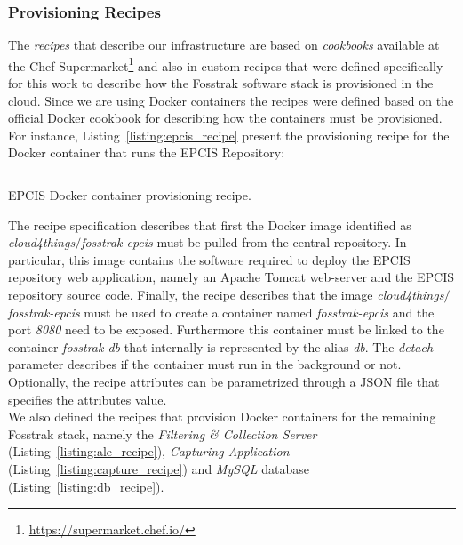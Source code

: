 \subsubsection{Provisioning Recipes}
\label{subs:recipes}
The \textit{recipes} that describe our infrastructure are based on \textit{cookbooks} available at the
Chef Supermarket\footnote{\url{https://supermarket.chef.io/}} and also in custom recipes that
were defined specifically for this work to describe how the Fosstrak software stack is provisioned
in the cloud. Since we are using Docker containers the recipes were defined based on the official
Docker cookbook for describing how the containers must be provisioned. For instance, Listing~\ref{listing:epcis_recipe}
present the provisioning recipe for the Docker container that runs the \gls{EPCIS} Repository:

\begin{listing}[ht!]
\inputminted[frame=lines,
             framesep=3mm,
             linenos=true,
             xleftmargin=21pt,
             tabsize=4]{ruby}{./listings/epcis_recipe.rb}
\caption{EPCIS Docker container provisioning recipe.}
\label{listing:epcis_recipe}
\end{listing}

The recipe specification describes that first the Docker image identified as \textit{cloud4things$/$fosstrak-epcis}
must be pulled from the central repository. In particular, this image contains the software required
to deploy the \gls{EPCIS} repository web application, namely an Apache Tomcat web-server and the \gls{EPCIS}
repository source code. Finally, the recipe describes that the image \textit{cloud4things$/$fosstrak-epcis}
must be used to create a container named \textit{fosstrak-epcis} and the port \textit{8080} need to
be exposed. Furthermore this container must be linked to the container \textit{fosstrak-db} that
internally is represented by the alias \textit{db}. The \textit{detach} parameter describes if the
container must run in the background or not. Optionally, the recipe attributes can be parametrized
through a \gls{JSON} file that specifies the attributes value.\\

We also defined the recipes that provision Docker containers for the remaining Fosstrak
stack, namely the \textit{Filtering \& Collection Server} (Listing~\ref{listing:ale_recipe}),
\textit{Capturing Application} (Listing~\ref{listing:capture_recipe}) and \textit{MySQL}
database (Listing~\ref{listing:db_recipe}).


